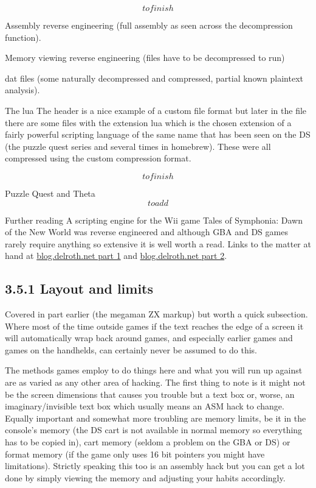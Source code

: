 \documentclass[
]{book}
\begin{document}
\[to finish\]

Assembly reverse engineering (full assembly as seen across the decompression function).

Memory viewing reverse engineering (files have to be decompressed to run)

dat files (some naturally decompressed and compressed, partial known plaintext analysis).

The lua The header is a nice example of a custom file format but later in the file there are some files with the extension lua which is the chosen extension of a fairly powerful scripting language of the same name that has been seen on the DS (the puzzle quest series and several times in homebrew). These were all compressed using the custom compression format.

\[to finish\]

Puzzle Quest and Theta \[to add\]

Further reading A scripting engine for the Wii game Tales of Symphonia: Dawn of the New World was reverse engineered and although GBA and DS games rarely require anything so extensive it is well worth a read. Links to the matter at hand at \href{http://blog.delroth.net/2011/06/reverse-engineering-a-wii-game-script-interpreter-part-1/}{blog.delroth.net part 1} and \href{http://blog.delroth.net/2011/06/reverse-engineering-a-wii-game-script-interpreter-part-2/}{blog.delroth.net part 2}.

\hypertarget{layout-and-limits}{%
\subsection{3.5.1 Layout and limits}\label{layout-and-limits}}

Covered in part earlier (the megaman ZX markup) but worth a quick subsection. Where most of the time outside games if the text reaches the edge of a screen it will automatically wrap back around games, and especially earlier games and games on the handhelds, can certainly never be assumed to do this.

The methods games employ to do things here and what you will run up against are as varied as any other area of hacking. The first thing to note is it might not be the screen dimensions that causes you trouble but a text box or, worse, an imaginary/invisible text box which usually means an ASM hack to change. Equally important and somewhat more troubling are memory limits, be it in the console's memory (the DS cart is not available in normal memory so everything has to be copied in), cart memory (seldom a problem on the GBA or DS) or format memory (if the game only uses 16 bit pointers you might have limitations). Strictly speaking this too is an assembly hack but you can get a lot done by simply viewing the memory and adjusting your habits accordingly.
\end{document}

